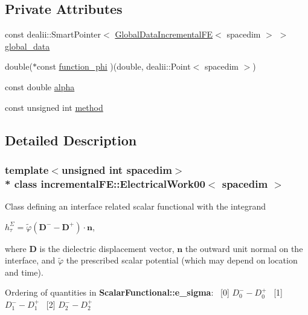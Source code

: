 \subsection*{Private Attributes}
\begin{DoxyCompactItemize}
\item 
const dealii\+::\+Smart\+Pointer$<$ \hyperlink{classincremental_f_e_1_1_global_data_incremental_f_e}{Global\+Data\+Incremental\+FE}$<$ spacedim $>$ $>$ \hyperlink{classincremental_f_e_1_1_electrical_work00_aa265094f77f4b0cf74ebb25f6b6bdc9f}{global\+\_\+data}
\item 
double($\ast$const \hyperlink{classincremental_f_e_1_1_electrical_work00_aa529e919f57a2cb3c6a6d63014431b9c}{function\+\_\+phi} )(double, dealii\+::\+Point$<$ spacedim $>$)
\item 
const double \hyperlink{classincremental_f_e_1_1_electrical_work00_a932398e0ec8ba1599cbb6cb1cdb0bdbc}{alpha}
\item 
const unsigned int \hyperlink{classincremental_f_e_1_1_electrical_work00_a6730746f75d7d3ebae632da3e7fd68d5}{method}
\end{DoxyCompactItemize}


\subsection{Detailed Description}
\subsubsection*{template$<$unsigned int spacedim$>$\\*
class incremental\+F\+E\+::\+Electrical\+Work00$<$ spacedim $>$}

Class defining an interface related scalar functional with the integrand

$h^\Sigma_\tau = \tilde\varphi (\boldsymbol{D}^- - \boldsymbol{D}^+) \cdot \boldsymbol{n}$,

where $\boldsymbol{D}$ is the dielectric displacement vector, $\boldsymbol{n}$ the outward unit normal on the interface, and $\tilde\varphi$ the prescribed scalar potential (which may depend on location and time).

Ordering of quantities in {\bf Scalar\+Functional\+::e\+\_\+sigma}\+:~\newline
 \mbox{[}0\mbox{]} $D^-_0 - D^+_0$~\newline
 \mbox{[}1\mbox{]} $D^-_1 - D^+_1$~\newline
 \mbox{[}2\mbox{]} $D^-_2 - D^+_2$ 


